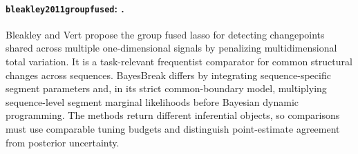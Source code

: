 \paragraph{\texttt{bleakley2011groupfused}: \citet{bleakley2011groupfused}.}
Bleakley and Vert propose the group fused lasso for detecting changepoints shared across multiple one-dimensional signals by penalizing multidimensional total variation. It is a task-relevant frequentist comparator for common structural changes across sequences. BayesBreak differs by integrating sequence-specific segment parameters and, in its strict common-boundary model, multiplying sequence-level segment marginal likelihoods before Bayesian dynamic programming. The methods return different inferential objects, so comparisons must use comparable tuning budgets and distinguish point-estimate agreement from posterior uncertainty.
